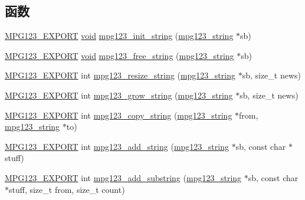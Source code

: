 \subsection*{函数}
\begin{DoxyCompactItemize}
\item 
\hyperlink{mpg123_8h_a2ba98cfba3f760879df70e755b2a61cc}{M\+P\+G123\+\_\+\+E\+X\+P\+O\+RT} \hyperlink{interfacevoid}{void} \hyperlink{group__mpg123__metadata_gaf0206ccb2574f563bff863a26a3b0025}{mpg123\+\_\+init\+\_\+string} (\hyperlink{structmpg123__string}{mpg123\+\_\+string} $\ast$sb)
\item 
\hyperlink{mpg123_8h_a2ba98cfba3f760879df70e755b2a61cc}{M\+P\+G123\+\_\+\+E\+X\+P\+O\+RT} \hyperlink{interfacevoid}{void} \hyperlink{group__mpg123__metadata_ga254cfe80f5eb2f2715e36be9a5119aed}{mpg123\+\_\+free\+\_\+string} (\hyperlink{structmpg123__string}{mpg123\+\_\+string} $\ast$sb)
\item 
\hyperlink{mpg123_8h_a2ba98cfba3f760879df70e755b2a61cc}{M\+P\+G123\+\_\+\+E\+X\+P\+O\+RT} int \hyperlink{group__mpg123__metadata_ga57ddead33785908618a5c0c7f3c1895a}{mpg123\+\_\+resize\+\_\+string} (\hyperlink{structmpg123__string}{mpg123\+\_\+string} $\ast$sb, size\+\_\+t news)
\item 
\hyperlink{mpg123_8h_a2ba98cfba3f760879df70e755b2a61cc}{M\+P\+G123\+\_\+\+E\+X\+P\+O\+RT} int \hyperlink{group__mpg123__metadata_ga1125e5a8235c42759d7300797006b05d}{mpg123\+\_\+grow\+\_\+string} (\hyperlink{structmpg123__string}{mpg123\+\_\+string} $\ast$sb, size\+\_\+t news)
\item 
\hyperlink{mpg123_8h_a2ba98cfba3f760879df70e755b2a61cc}{M\+P\+G123\+\_\+\+E\+X\+P\+O\+RT} int \hyperlink{group__mpg123__metadata_ga9d7fe63da5bc665bc754975b293e0a6b}{mpg123\+\_\+copy\+\_\+string} (\hyperlink{structmpg123__string}{mpg123\+\_\+string} $\ast$from, \hyperlink{structmpg123__string}{mpg123\+\_\+string} $\ast$to)
\item 
\hyperlink{mpg123_8h_a2ba98cfba3f760879df70e755b2a61cc}{M\+P\+G123\+\_\+\+E\+X\+P\+O\+RT} int \hyperlink{group__mpg123__metadata_gab54a099feebd65c5fa77d49a8c9c6db5}{mpg123\+\_\+add\+\_\+string} (\hyperlink{structmpg123__string}{mpg123\+\_\+string} $\ast$sb, const char $\ast$stuff)
\item 
\hyperlink{mpg123_8h_a2ba98cfba3f760879df70e755b2a61cc}{M\+P\+G123\+\_\+\+E\+X\+P\+O\+RT} int \hyperlink{group__mpg123__metadata_ga76c2bf2ead81199a750ddff7253371f1}{mpg123\+\_\+add\+\_\+substring} (\hyperlink{structmpg123__string}{mpg123\+\_\+string} $\ast$sb, const char $\ast$stuff, size\+\_\+t from, size\+\_\+t count)

\end{DoxyCompactItemize}
